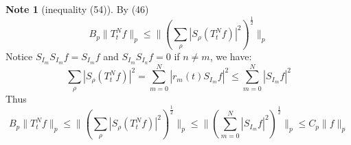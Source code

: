 \documentclass{report}
\theoremstyle{definition}
\newtheorem{note}{Note}
\theoremstyle{definition}
\theoremstyle{plain}
\numberwithin{theorem}{section}
\numberwithin{remark}{section}
\numberwithin{equation}{section}
\newcommand{\norm}[1]{\lVert#1\rVert}
\newcommand{\abs}[1]{\left\lvert#1\right\rvert}
\begin{document}
\begin{note}[inequality (54)]
    By (46)
    \begin{equation*}
        B_p\norm{T_t^Nf}_p\leq\norm{(\sum_\rho \abs{S_\rho (T_t^Nf)}^2)^\frac{1}{2}}_p
    \end{equation*}
    Notice $S_{I_m}S_{I_m}f=S_{I_m}f$ and $S_{I_m}S_{I_n}f=0$ if $n\neq m$, we have:
    \begin{equation*}
        \sum_\rho \abs{S_\rho (T_t^Nf)}^2= \sum_{m=0}^N \abs{r_m(t)S_{I_m}f}^2\leq\sum_{m=0}^N \abs{S_{I_m}f}^2
    \end{equation*}
    Thus
    \begin{equation*}
        B_p\norm{T_t^Nf}_p\leq\norm{(\sum_\rho \abs{S_\rho (T_t^Nf)}^2)^\frac{1}{2}}_p\leq\norm{(\sum_{m=0}^N \abs{S_{I_m}f}^2)^\frac{1}{2}}_p\leq C_p\norm{f}_p
    \end{equation*}
\end{note}
\end{document}
